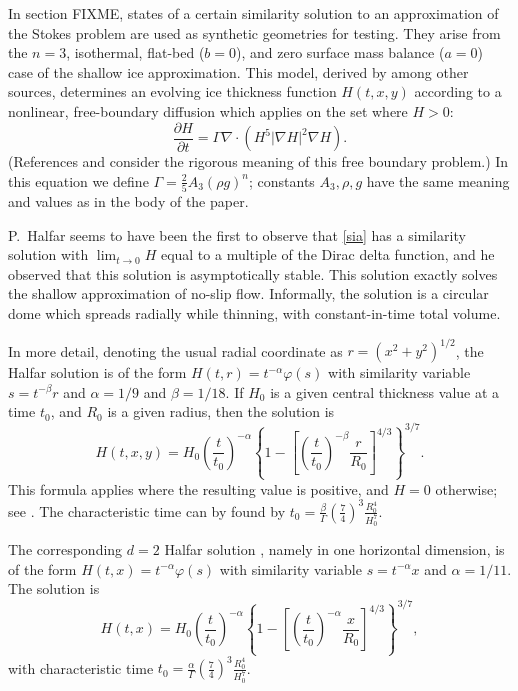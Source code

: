 \documentclass[letterpaper,final,12pt,reqno]{amsart}
\newcommand{\grad}{\nabla}
\newcommand{\Div}{\nabla\cdot}
\begin{document}
In section FIXME, states of a certain similarity solution to an approximation of the Stokes problem are used as synthetic geometries for testing.  They arise from the $n=3$, isothermal, flat-bed ($b=0$), and zero surface mass balance ($a=0$) case of the shallow ice approximation.  This model, derived by \cite{GreveBlatter2009} among other sources, determines an evolving ice thickness function $H(t,x,y)$ according to a nonlinear, free-boundary diffusion which applies on the set where $H>0$:
\begin{equation}
\frac{\partial H}{\partial t} = \Gamma \Div \left(H^5 |\grad H|^2 \grad H\right). \label{sia}
\end{equation}
(References \cite{Bueler2016} and \cite{JouvetBueler2012} consider the rigorous meaning of this free boundary problem.)  In this equation we define $\Gamma = \frac{2}{5} A_3 (\rho g)^n$; constants $A_3,\rho,g$ have the same meaning and values as in the body of the paper.

P.~Halfar \cite{Halfar1981,Halfar1983} seems to have been the first to observe that \eqref{sia} has a similarity solution with $\lim_{t\to 0} H$ equal to a multiple of the Dirac delta function, and he observed that this solution is asymptotically stable.  This solution exactly solves the shallow approximation of no-slip flow.  Informally, the solution is a circular dome which spreads radially while thinning, with constant-in-time total volume.

In more detail, denoting the usual radial coordinate as $r=(x^2+y^2)^{1/2}$, the Halfar solution \cite{Halfar1983} is of the form $H(t,r) = t^{-\alpha} \varphi(s)$ with similarity variable $s=t^{-\beta} r$ and $\alpha=1/9$ and $\beta=1/18$.  If $H_0$ is a given central thickness value at a time $t_0$, and $R_0$ is a given radius, then the solution is
    $$H(t,x,y) = H_0 \left(\frac{t}{t_0}\right)^{-\alpha} \left\{1 - \left[\left(\frac{t}{t_0}\right)^{-\beta} \frac{r}{R_0}\right]^{4/3}\right\}^{3/7}.$$
This formula applies where the resulting value is positive, and $H=0$ otherwise; see \cite{Bueleretal2005}.  The characteristic time can by found by $\displaystyle t_0 = \frac{\beta}{\Gamma} \left(\frac{7}{4}\right)^3 \frac{R_0^4}{H_0^7}$.

The corresponding $d=2$ Halfar solution \cite{Halfar1981}, namely in one horizontal dimension, is of the form $H(t,x) = t^{-\alpha} \varphi(s)$ with similarity variable $s=t^{-\alpha} x$ and $\alpha=1/11$.  The solution is
    $$H(t,x) = H_0 \left(\frac{t}{t_0}\right)^{-\alpha} \left\{1 - \left[\left(\frac{t}{t_0}\right)^{-\alpha} \frac{x}{R_0}\right]^{4/3}\right\}^{3/7},$$
with characteristic time $\displaystyle t_0 = \frac{\alpha}{\Gamma} \left(\frac{7}{4}\right)^3 \frac{R_0^4}{H_0^7}$.

\small

\bigskip


\end{document}
